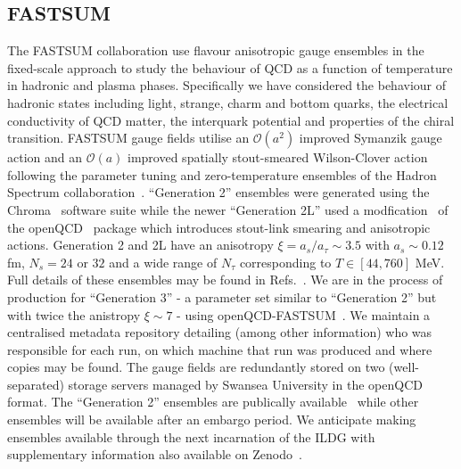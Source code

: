 \documentclass[a4paper,11pt]{article}
\begin{document}
\subsection{FASTSUM}
The FASTSUM collaboration use  flavour anisotropic gauge ensembles in the fixed-scale approach to study the behaviour of QCD as a function of temperature in hadronic and plasma phases. Specifically we have considered the behaviour of hadronic states including light, strange, charm and bottom quarks, the electrical conductivity of QCD matter, the interquark potential and properties of the chiral transition. %
FASTSUM gauge fields utilise an $\mathcal{O}\left(a^2\right)$ improved Symanzik gauge action and an $\mathcal{O}\left(a\right)$ improved spatially stout-smeared Wilson-Clover action following the parameter tuning and zero-temperature ensembles of the Hadron Spectrum collaboration~\cite{Edwards:2008ja,HadronSpectrum:2008xlg}. ``Generation 2'' ensembles were generated using the Chroma~\cite{Edwards:2004sx} software suite while the newer ``Generation 2L'' used a modfication~\cite{glesaaen_jonas_rylund_2018_2216355} of the {\sc openQCD}~\cite{Luscher:2012av,openqcd} package which introduces stout-link smearing and anisotropic actions. Generation 2 and 2L have an anisotropy $\xi = a_s/a_\tau \sim 3.5$ with $a_s\sim 0.12$ fm, $N_s = 24$ or $32$ and a wide range of $N_\tau$ corresponding to $T \in[44,760]$ MeV. %
Full details of these ensembles may be found in Refs.~\cite{Aarts:2014nba,Aarts:2020vyb}. We are in the process of production for ``Generation 3'' - a parameter set similar to ``Generation 2'' but with twice the anistropy $\xi \sim 7$ - using {\sc openQCD-FASTSUM}~\cite{glesaaen_jonas_rylund_2018_2216355}. %
We maintain a centralised metadata repository detailing (among other information) who was responsible for each run, on which machine that run was produced and where copies may be found. The gauge fields are redundantly stored on two (well-separated) storage servers managed by Swansea University in the openQCD format. The ``Generation 2'' ensembles are publically available~\cite{aarts_2024_8403827} while other ensembles will be available after an embargo period. We anticipate making ensembles available through the next incarnation of the ILDG with supplementary information also available on Zenodo~\cite{zenodo,aarts_2024_8403827}.
\end{document}
